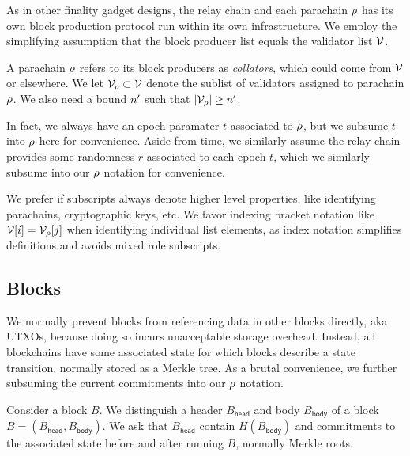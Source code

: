 As in other finality gadget designs, the relay chain and each parachain $\rho$ has its own block production protocol run within its own infrastructure.  We employ the simplifying assumption that the block producer list equals the validator list $\mathcal{V}$.  


A parachain $\rho$ refers to its block producers as {\em collators}, which could come from $\mathcal{V}$ or elsewhere.  We let $\mathcal{V}_{\rho} \subset \mathcal{V}$ denote the sublist of validators assigned to parachain $\rho$.  We also need a bound $n'$ such that $|\mathcal{V}_{\rho}| \ge n'$.

In fact, we always have an epoch paramater $t$ associated to $\rho$, but we subsume $t$ into $\rho$ here for convenience.  Aside from time, we similarly assume the relay chain provides some randomness $r$ associated to each epoch $t$, which we similarly subsume into our $\rho$ notation for convenience.

We prefer if subscripts always denote higher level properties, like identifying parachains, cryptographic keys, etc.  We favor indexing bracket notation like $\mathcal{V}[i] = \mathcal{V}_{\rho}[j]$ when identifying individual list elements, as index notation simplifies definitions and avoids mixed role subscripts. 

\subsection{Blocks}

We normally prevent blocks from referencing data in other blocks directly, aka UTXOs, because doing so incurs unacceptable storage overhead.  Instead, all blockchains have some associated state for which blocks describe a state transition, normally stored as a Merkle tree.  As a brutal convenience, we further subsuming the current commitments into our $\rho$ notation.

Consider a block $B$.  We distinguish a header $B_{\mathsf{head}}$ and body $B_{\mathsf{body}}$ of a block $B = (B_{\mathsf{head}},B_{\mathsf{body}})$.  We ask that $B_{\mathsf{head}}$ contain $H(B_{\mathsf{body}})$ and commitments to the associated state before and after running $B$, normally Merkle roots.  

